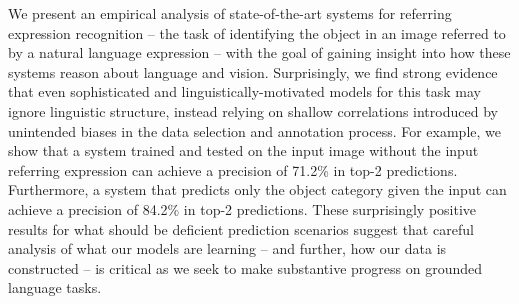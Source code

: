 We present an empirical analysis of state-of-the-art systems for referring expression recognition -- the task of identifying the object in an image referred to by a natural language expression -- with the goal of gaining insight into how these systems reason about language and vision. Surprisingly, we find strong evidence that even sophisticated and linguistically-motivated models for this task may ignore linguistic structure, instead relying on shallow correlations introduced by unintended biases in the data selection and annotation process. For example, we show that a system trained and tested on the input image without the input referring expression can achieve a precision of 71.2\% in top-2 predictions. Furthermore, a system that predicts only the object category given the input can achieve a precision of 84.2\% in top-2 predictions. These surprisingly positive results for what should be deficient prediction scenarios suggest that careful analysis of what our models are learning -- and further, how our data is constructed -- is critical as we seek to make substantive progress on grounded language tasks.
